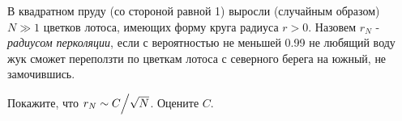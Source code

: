 \begin{problem}
\begin{ordre}
\end{ordre}

\begin{problem}[перколяция] 
В квадратном пруду (со стороной равной 1) 
выросли (случайным образом) $N\gg 1$ цветков лотоса, имеющих форму круга 
радиуса $r>0$. Назовем $r_N $ - \textit{радиусом перколяции}, если с вероятностью не меньшей 0.99 не 
любящий воду жук сможет переползти по цветкам лотоса с северного берега на 
южный, не замочившись.

Покажите, что $r_N \sim C \mathord{\left/ {\vphantom {C {\sqrt N }}} \right. 
\kern-\nulldelimiterspace} {\sqrt N }$. Оцените $C$.
\end{problem}

\end{problem}